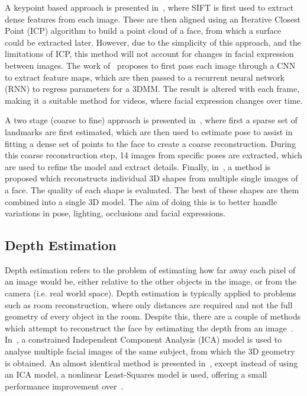 A keypoint based approach is presented in~\cite{mayo20093d}, where
SIFT is first used to extract dense features from each image. These
are then aligned using an Iterative Closest Point (ICP) algorithm to
build a point cloud of a face, from which a surface could be extracted
later. However, due to the simplicity of this approach, and the
limitations of ICP, this method will not account for changes in facial
expression between images. The work of~\cite{dou2018multi} proposes to
first pass each image through a CNN to extract feature maps, which are
then passed to a recurrent neural network (RNN) to regress parameters
for a 3DMM. The result is altered with each frame, making it a
suitable method for videos, where facial expression changes over time.

A two stage (coarse to fine) approach is presented
in~\cite{dai2018coarse}, where first a sparse set of landmarks are
first estimated, which are then used to estimate pose to assist in
fitting a dense set of points to the face to create a coarse
reconstruction. During this coarse reconstruction step, 14 images from
specific poses are extracted, which are used to refine the model and
extract details. Finally, in~\cite{Piotraschke_2016_CVPR}, a method is
proposed which reconstructs individual 3D shapes from multiple single
images of a face. The quality of each shape is evaluated. The best of
these shapes are them combined into a single 3D model. The aim of
doing this is to better handle variations in pose, lighting,
occlusions and facial expressions.

\subsection{Depth Estimation}

Depth estimation refers to the problem of estimating how far away each
pixel of an image would be, either relative to the other objects in
the image, or from the camera (i.e. real world space). Depth
estimation is typically applied to problems such as room
reconstruction, where only distances are required and not the full
geometry of every object in the room. Despite this, there are a couple
of methods which attempt to reconstruct the face by estimating the
depth from an image~\cite{sun2011depth,sun2013depth}. In~\cite{sun2011depth}, a
constrained Independent Component Analysis (ICA) model is used to
analyse multiple facial images of the same subject, from which the 3D
geometry is obtained. An almost identical method is presented
in~\cite{sun2013depth}, except instead of using an ICA model, a
nonlinear Least-Squares model is used, offering a small performance
improvement over~\cite{sun2011depth}.


